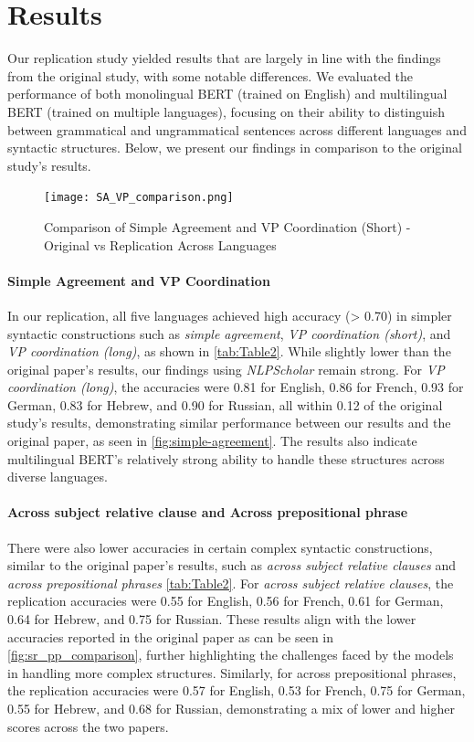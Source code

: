 \documentclass[11pt]{article}
\begin{document}
\section{Results}
Our replication study yielded results that are largely in line with the findings from the original study, with some notable differences. We evaluated the performance of both monolingual BERT (trained on English) and multilingual BERT (trained on multiple languages), focusing on their ability to distinguish between grammatical and ungrammatical sentences across different languages and syntactic structures. Below, we present our findings in comparison to the original study's results.


\begin{figure}[htbp]
    \centering
    \texttt{[image: SA\_VP\_comparison.png]}
    \caption{Comparison of Simple Agreement and VP Coordination (Short) - Original vs Replication Across Languages}
    \label{fig:simple-agreement}
\end{figure}

\paragraph{Simple Agreement and VP Coordination}

In our replication, all five languages achieved high accuracy (> 0.70) in simpler syntactic constructions such as \textit{simple agreement}, \textit{VP coordination (short)}, and \textit{VP coordination (long)}, as shown in \autoref{tab:Table2}. While slightly lower than the original paper’s results, our findings using \textit{NLPScholar} remain strong. For \textit{VP coordination (long)}, the accuracies were 0.81 for English, 0.86 for French, 0.93 for German, 0.83 for Hebrew, and 0.90 for Russian, all within 0.12 of the original study's results, demonstrating similar performance between our results and the original paper, as seen in \autoref{fig:simple-agreement}. The results also indicate multilingual BERT's relatively strong ability to handle these structures across diverse languages.

\paragraph{Across subject relative clause and Across prepositional phrase}
There were also lower accuracies in certain complex syntactic constructions, similar to the original paper’s results, such as \textit{across subject relative clauses} and \textit{across prepositional phrases} \autoref{tab:Table2}. For \textit{across subject relative clauses}, the replication accuracies were 0.55 for English, 0.56 for French, 0.61 for German, 0.64 for Hebrew, and 0.75 for Russian. These results align with the lower accuracies reported in the original paper as can be seen in \autoref{fig:sr_pp_comparison}, further highlighting the challenges faced by the models in handling more complex structures. Similarly, for across prepositional phrases, the replication accuracies were 0.57 for English, 0.53 for French, 0.75 for German, 0.55 for Hebrew, and 0.68 for Russian, demonstrating a mix of lower and higher scores across the two papers.
\end{document}
